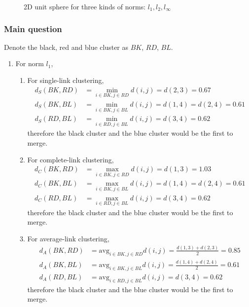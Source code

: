\documentclass[submit]{harvardml}
\begin{document}
\begin{figure}[ht]
    \caption{2D unit sphere for three kinds of norms: $l_1, l_2, l_\infty$}
\end{figure}
    
\subsubsection*{Main question}

Denote the black, red and blue cluster as $BK$, $RD$, $BL$.

\begin{enumerate}
    \item For norm $l_1$,
    \begin{enumerate}
        \item For single-link clustering,
        \begin{align*}
            d_S(BK, RD) &= \min_{i\in BK, j\in RD}d(i,j) = d(2,3) = 0.67 \\
            d_S(BK, BL) &= \min_{i\in BK, j\in BL}d(i,j) = d(1,4) = d(2,4) = 0.61 \\
            d_S(RD, BL) &= \min_{i\in RD, j\in BL}d(i,j) = d(3,4) = 0.62
        \end{align*}
        therefore the black cluster and the blue cluster would be the first to merge.
        
        \item For complete-link clustering,
        \begin{align*}
            d_C(BK, RD) &= \max_{i\in BK, j\in RD}d(i,j) = d(1,3) = 1.03 \\
            d_C(BK, BL) &= \max_{i\in BK, j\in BL}d(i,j) = d(1,4) = d(2,4) = 0.61 \\
            d_C(RD, BL) &= \max_{i\in RD, j\in BL}d(i,j) = d(3,4) = 0.62
        \end{align*}
        therefore the black cluster and the blue cluster would be the first to merge.
        
        \item For average-link clustering,
        \begin{align*}
            d_A(BK, RD) &= \text{avg}_{i\in BK, j\in RD}d(i,j) = \frac{d(1,3) + d(2,3)}{2} = 0.85 \\
            d_A(BK, BL) &= \text{avg}_{i\in BK, j\in BL}d(i,j) = \frac{d(1,4) + d(2,4)}{2} = 0.61 \\
            d_A(RD, BL) &= \text{avg}_{i\in RD, j\in BL}d(i,j) = d(3,4) = 0.62
        \end{align*}
        therefore the black cluster and the blue cluster would be the first to merge.
    \end{enumerate}
    

\end{enumerate}
\end{document}
